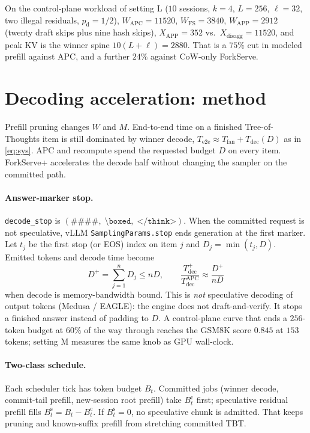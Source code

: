 \documentclass[11pt,a4paper]{article}
\begin{document}
On the control-plane workload of setting L ($10$ sessions, $k{=}4$, $L{=}256$, $\ell{=}32$, two illegal residuals, $p_{\mathrm{d}}{=}1/2$),
$W_{\mathrm{APC}}{=}11520$, $W_{\mathrm{FS}}{=}3840$, $W_{\mathrm{APP}}{=}2912$ (twenty draft skips plus nine hash skips), $X_{\mathrm{APP}}{=}352$ vs.\ $X_{\mathrm{disagg}}{=}11520$, and peak KV is the winner spine $10(L+\ell){=}2880$.
That is a $75\%$ cut in modeled prefill against APC, and a further $24\%$ against CoW-only ForkServe.

\section{Decoding acceleration: method}
\label{sec:dec-theory}

Prefill pruning changes $W$ and $M$.
End-to-end time on a finished Tree-of-Thoughts item is still dominated by winner decode,
$T_{\mathrm{e2e}}\approx T_{\mathrm{fan}}+T_{\mathrm{dec}}(D)$ as in \eqref{eq:sys}.
APC and recompute spend the requested budget $D$ on every item.
ForkServe+ accelerates the decode half without changing the sampler on the committed path.

\paragraph{Answer-marker stop.}
\texttt{decode\_stop} is $(\texttt{\#\#\#\#},\;\texttt{\textbackslash boxed},\;\texttt{</think>})$.
When the committed request is not speculative, vLLM \texttt{SamplingParams.stop} ends generation at the first marker.
Let $t_j$ be the first stop (or EOS) index on item $j$ and $D_j=\min(t_j,D)$.
Emitted tokens and decode time become
\begin{equation}
\label{eq:dec-stop}
D^{+}
  = \sum_{j=1}^{n} D_j
  \le nD,
\qquad
\frac{T_{\mathrm{dec}}^{+}}{T_{\mathrm{dec}}^{\mathrm{APC}}}
  \approx
\frac{D^{+}}{nD}
\end{equation}
when decode is memory-bandwidth bound.
This is \emph{not} speculative decoding of output tokens (Medusa / EAGLE): the engine does not draft-and-verify.
It stops a finished answer instead of padding to $D$.
A control-plane curve that ends a $256$-token budget at $60\%$ of the way through reaches the GSM8K score $0.845$ at $153$ tokens; setting M measures the same knob as GPU wall-clock.

\paragraph{Two-class schedule.}
Each scheduler tick has token budget $B_t$.
Committed jobs (winner decode, commit-tail prefill, new-session root prefill) take $B^{\mathrm{c}}_t$ first; speculative residual prefill fills $B^{\mathrm{s}}_t=B_t-B^{\mathrm{c}}_t$.
If $B^{\mathrm{s}}_t{=}0$, no speculative chunk is admitted.
That keeps pruning and known-suffix prefill from stretching committed TBT.
\end{document}
